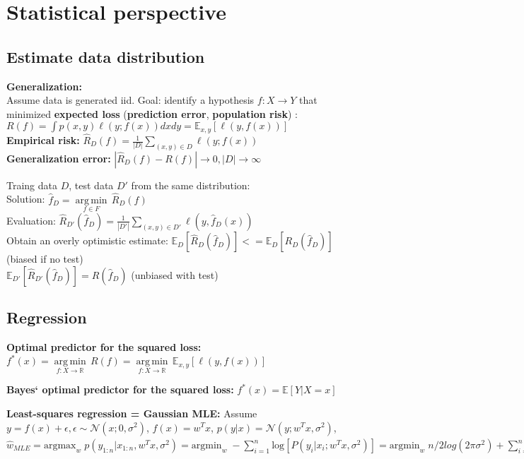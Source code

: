 

\section{Statistical perspective}
\subsection{Estimate data distribution}
    \textbf{Generalization:}\\
    Assume data is generated iid. Goal: identify a hypothesis $f: X \rightarrow Y$ that minimized \textbf{expected loss} (\textbf{prediction error}, \textbf{population risk}) :
    $R(f) = \int p(x,y)  \ell(y; f(x))dxdy = \mathbb{E}_{x, y}[\ell(y, f(x))]$ \\
    \textbf{Empirical risk:} 
    $\hat{R}_D(f) = \frac{1}{|D|} \sum\limits_{(x, y) \in D} \ell(y; f(x)) $ \\
    \textbf{Generalization error:} 
    $| \hat{R}_D(f) - R(f) |  \rightarrow 0, |D| \rightarrow \infty$ 

    Traing data $D$, test data $D'$ from the same distribution:\\
    Solution: $\hat{f}_D = \underset {f \in F} { \operatorname {arg\,min} } \,  \hat{R}_D(f)$ \\
    Evaluation: $\hat{R}_{D'}(\hat{f}_D) = \frac{1}{|D'|} \sum\limits_{(x, y) \in D'} \ell(y, \hat{f}_D(x)) $ \\
    Obtain an overly optimistic estimate: $\mathbb{E}_{D}[\hat{R}_D(\hat{f}_D)] <= \mathbb{E}_{D}[R_D(\hat{f}_D)]$ (biased if no test)\\
    $\mathbb{E}_{D'}[\hat{R}_{D'}(\hat{f}_D)] = R(\hat{f}_D)$ (unbiased with test)

\subsection{ Regression}
    \textbf{Optimal predictor for the squared loss:}\\
    $f^*(x) =  \underset {f: X \rightarrow \mathbb{R}} { \operatorname {arg\,min} } \,  R(f)  =  \underset {f: X \rightarrow \mathbb{R}} { \operatorname {arg\,min} } \,  \mathbb{E}_{x, y}[\ell(y, f(x))]$ 

    \textbf{Bayes‘ optimal predictor for the squared loss:}
    $f^*(x) = \mathbb{E}[Y|X=x]$ 
    
    \textbf{Least-squares regression = Gaussian MLE:}
    Assume $y = f(x)+ \epsilon, \epsilon \sim \mathcal{N}(x;0,\sigma^2)$, $f(x)=w^Tx$,  $p(y|x) = \mathcal{N}(y;w^Tx,\sigma^2)$, 
    $\hat{w}_{MLE}= \mathrm{argmax}_w\; p(y_{1:n}|x_{1:n}, w^Tx,\sigma^2) =  \mathrm{argmin}_w\; -\sum_{i=1}^n \mathrm{log}\left[ P(y_i|x_i;w^Tx,\sigma^2)\right] = \mathrm{argmin}_w\; n/2 log(2 \pi \sigma^2) + \sum_{i=1}^n (y_i - w^T x_i)^2 / (2 \sigma^2)$\\

